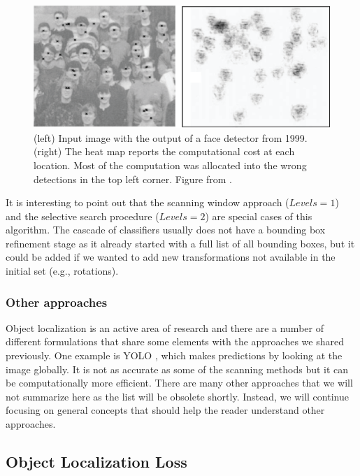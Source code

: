 \begin{figure}
\centerline{
\includegraphics[width=.8\linewidth]{figures/object_recognition/cascade.eps}
}
\caption{(left) Input image with the output of a face detector from 1999. (right) The heat map reports the computational cost at each location. Most of the computation was allocated into the wrong detections in the top left corner. Figure from \cite{Fleuret2001}.}
\end{figure}

It is interesting to point out that the scanning window approach ($Levels = 1$) and the selective search procedure ($Levels = 2$) are special cases of this algorithm. The cascade of classifiers usually does not have a bounding box refinement stage as it already started with a full list of all bounding boxes, but it could be added if we wanted to add new transformations not available in the initial set (e.g., rotations). 

\subsubsection{Other approaches}
Object localization is an active area of research and there are a number of different formulations that share some elements with the approaches we shared previously. One example is YOLO  \cite{Redmon2016}, which makes predictions by looking at the image globally. It is not as accurate as some of the scanning methods but it can be computationally more efficient. There are many other approaches that we will not summarize here as the list will be obsolete shortly. Instead, we will continue focusing on general concepts that should help the reader understand other approaches.

\subsection{Object Localization Loss}

